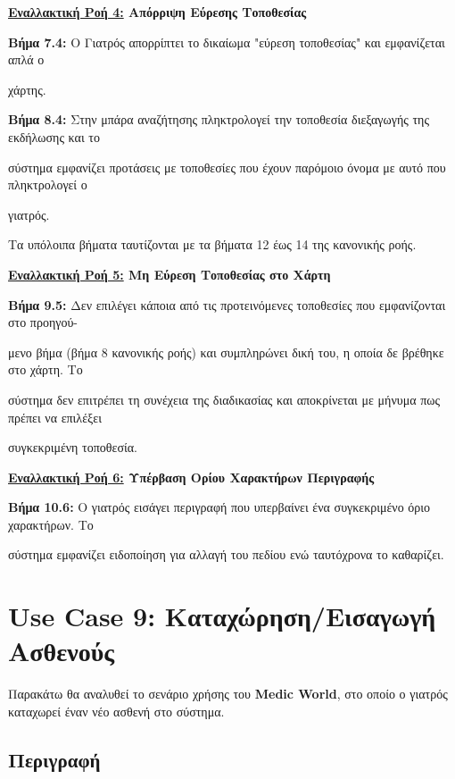 \documentclass{article}
\begin{document}
\textbf{\underline{Εναλλακτική Ροή 4:} Απόρριψη Εύρεσης Τοποθεσίας} \vspace{0.2cm}
\par \textbf{Βήμα 7.4:} Ο Γιατρός απορρίπτει το δικαίωμα "εύρεση τοποθεσίας" και εμφανίζεται απλά ο \par χάρτης. \vspace{0.1cm}
\par \textbf{Βήμα 8.4:} Στην μπάρα αναζήτησης πληκτρολογεί την τοποθεσία διεξαγωγής της εκδήλωσης και το \par σύστημα εμφανίζει προτάσεις με τοποθεσίες που έχουν παρόμοιο όνομα με αυτό που πληκτρολογεί ο \par γιατρός. \vspace{0.1cm}

Τα υπόλοιπα βήματα ταυτίζονται με τα βήματα 12 έως 14 της κανονικής ροής. \vspace{0.2cm}

\textbf{\underline{Εναλλακτική Ροή 5:} Μη Εύρεση Τοποθεσίας στο Χάρτη} \vspace{0.2cm}
\par \textbf{Βήμα 9.5:} Δεν επιλέγει κάποια από τις προτεινόμενες τοποθεσίες που εμφανίζονται στο προηγού- \par μενο βήμα (βήμα 8 κανονικής ροής) και συμπληρώνει δική του, η οποία δε βρέθηκε στο χάρτη. Το \par σύστημα δεν επιτρέπει τη συνέχεια της διαδικασίας και αποκρίνεται με μήνυμα πως πρέπει να επιλέξει \par συγκεκριμένη τοποθεσία. \vspace{0.2cm}

\textbf{\underline{Εναλλακτική Ροή 6:} Υπέρβαση Ορίου Χαρακτήρων Περιγραφής} \vspace{0.2cm}
\par \textbf{Βήμα 10.6:} Ο γιατρός εισάγει περιγραφή που υπερβαίνει ένα συγκεκριμένο όριο χαρακτήρων. Το \par σύστημα εμφανίζει ειδοποίηση για αλλαγή του πεδίου ενώ ταυτόχρονα το καθαρίζει.

\section{Use Case 9: Καταχώρηση/Εισαγωγή Ασθενούς}

Παρακάτω θα αναλυθεί το σενάριο χρήσης του \textbf{Medic World}, στο οποίο ο γιατρός καταχωρεί έναν νέο ασθενή στο σύστημα.

\subsection{Περιγραφή}
\end{document}
